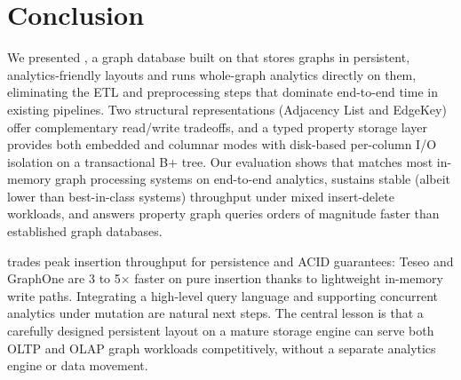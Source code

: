 \chapter{Conclusion}
\label{sec:conclusion}

We presented \project{}, a graph database built on \wt{} that stores graphs in persistent, analytics-friendly layouts and runs whole-graph analytics directly on them, eliminating the ETL and preprocessing steps that dominate end-to-end time in existing pipelines.
Two structural representations (Adjacency List and EdgeKey) offer complementary read/write tradeoffs, and a typed property storage layer provides both embedded and columnar modes with disk-based per-column I/O isolation on a transactional B+ tree.
Our evaluation shows that \project{} matches most in-memory graph processing systems on end-to-end analytics, sustains stable (albeit lower than best-in-class systems) throughput under mixed insert-delete workloads, and answers property graph queries orders of magnitude faster than established graph databases.

\project{} trades peak insertion throughput for persistence and ACID guarantees: Teseo and GraphOne are 3 to 5$\times$ faster on pure insertion thanks to lightweight in-memory write paths.
Integrating a high-level query language and supporting concurrent analytics under mutation are natural next steps.
The central lesson is that a carefully designed persistent layout on a mature storage engine can serve both OLTP and OLAP graph workloads competitively, without a separate analytics engine or data movement.